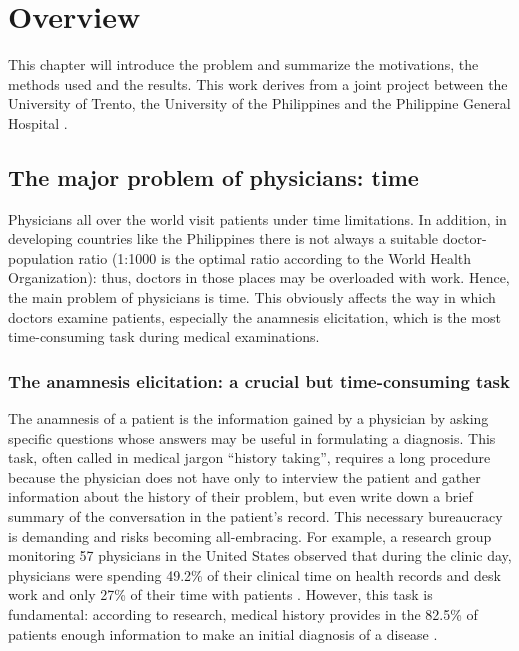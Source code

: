 \chapter{Overview}
\label{cha:intro}

This chapter will introduce the problem and summarize the motivations, the methods used and the results. This work derives from a joint project between the University of Trento, the University of the Philippines and the Philippine General Hospital \cite{johndocument}.

\section{The major problem of physicians: time}
\label{sec:problem_doctors}

Physicians all over the world visit patients under time limitations. In addition, in developing countries like the Philippines there is not always a suitable doctor-population ratio (1:1000 is the optimal ratio according to the World Health Organization)\cite{johndocument}: thus, doctors in those places may be overloaded with work. Hence, the main problem of physicians is time. This obviously affects the way in which doctors examine patients, especially the anamnesis elicitation, which is the most time-consuming task during medical examinations.

\subsection{The anamnesis elicitation: a crucial but time-consuming task}

The anamnesis of a patient is the information gained by a physician by asking specific questions whose answers may be useful in formulating a diagnosis\cite{historytakingwiki}. This task, often called in medical jargon “history taking”, requires a long procedure because the physician does not have only to interview the patient and gather information about the history of their problem, but even write down a brief summary of the conversation in the patient’s record. This necessary bureaucracy is demanding and risks becoming all-embracing. For example, a research group monitoring 57 physicians in the United States observed that during the clinic day, physicians were spending 49.2\% of their clinical time on health records and desk work and only 27\% of their time with patients \cite{sinsky}. However, this task is fundamental: according to research, medical history provides in the 82.5\% of patients enough information to make an initial diagnosis of a disease \cite{hampton1975}.

